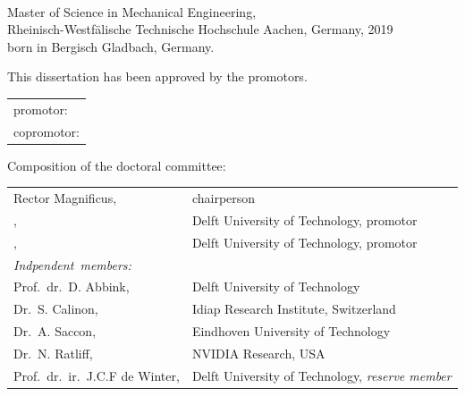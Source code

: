 \begin{titlepage}
\begin{center}
\makeatletter
{\Large\titlefont\bfseries\@firstname\ {\titleshape\@lastname}}
\makeatother

\bigskip
\bigskip

Master of Science in Mechanical Engineering, \\
Rheinisch-Westfälische Technische Hochschule Aachen,
Germany, 2019 \\
born in Bergisch Gladbach, Germany.

\vspace*{2\bigskipamount}

\end{center}

\clearpage
\thispagestyle{empty}

\noindent This dissertation has been approved by the
promotors.

\medskip\noindent
\begin{tabular}{l}
    promotor: \promotor{} \\
    copromotor: \copromotor{}
\end{tabular}

\bigskip
\noindent Composition of the doctoral committee:

\medskip\noindent
\begin{tabular}{p{4cm}l}
    Rector Magnificus, & chairperson\\
    \promotor{}, & Delft University of Technology, promotor \\
    \copromotor{}, & Delft University of Technology, promotor \\

    \medskip
    \mbox{\emph{Indpendent members:}} & \\

    Prof.\ dr.\ D. Abbink, & Delft University of Technology \\
    Dr.\ S. Calinon, & Idiap Research Institute, Switzerland \\
    Dr.\ A. Saccon, & Eindhoven University of Technology \\
    Dr.\ N. Ratliff, & NVIDIA Research, USA \\
    Prof.\ dr.\ ir.\ J.C.F de Winter, & Delft University of Technology, \textit{reserve member}  \\



\end{tabular}
\end{titlepage}
